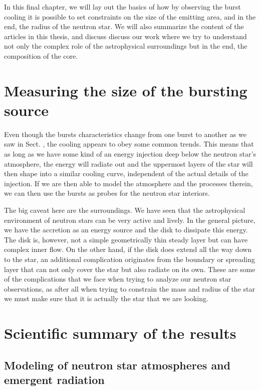 In this final chapter, we will lay out the basics of how by observing the burst cooling it is possible to set constraints on the size of the emitting area, and in the end, the radius of the neutron star.
We will also summarize the content of the articles in this thesis, and discuss discuss our work where we try to understand not only the complex role of the astrophysical surroundings but in the end, the composition of the core.


\section{Measuring the size of the bursting source}

Even though the bursts characteristics change from one burst to another as we saw in Sect. , the cooling appears to obey some common trends.
This means that as long as we have some kind of an energy injection deep below the neutron star's atmosphere, the energy will radiate out and the uppermost layers of the star will then shape into a similar cooling curve, independent of the actual details of the injection.
If we are then able to model the atmosphere and the processes therein, we can then use the bursts as probes for the neutron star interiors.




The big caveat here are the surroundings.
We have seen that the astrophysical environment of neutron stars can be very active and lively.
In the general picture, we have the accretion as an energy source and the disk to dissipate this energy.
The disk is, however, not a simple geometrically thin steady layer but can have complex inner flow.
On the other hand, if the disk does extend all the way down to the star, an additional complication originates from the boundary or spreading layer that can not only cover the star but also radiate on its own.
These are some of the complications that we face when trying to analyze our neutron star observations, as after all when trying to constrain the mass and radius of the star we must make sure that it is actually the star that we are looking.


\section{Scientific summary of the results}

\subsection{Modeling of neutron star atmospheres and emergent radiation}


